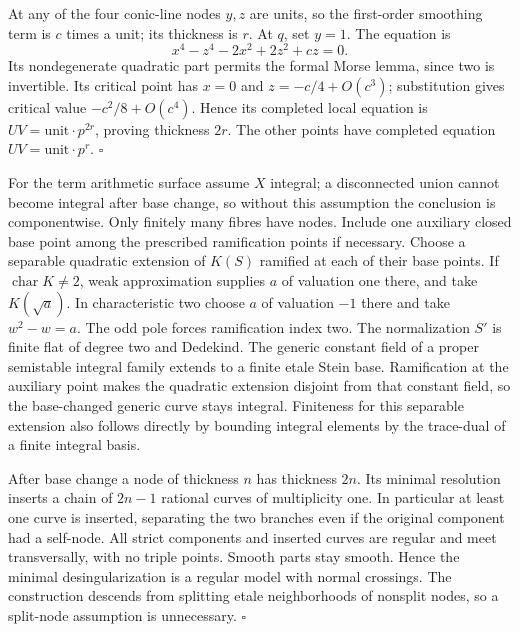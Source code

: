 \documentclass[11pt]{article}
\let\chapterexercise\exercise
\renewcommand{\exercise}[2]{\Needspace{8\baselineskip}\chapterexercise{#1}{#2}}
\begin{document}
At any of the four conic-line nodes $y,z$ are units, so the first-order smoothing term is $c$ times a unit; its thickness is $r$. At $q$, set $y=1$. The equation is
\[ x^4-z^4-2x^2+2z^2+cz=0. \]
Its nondegenerate quadratic part permits the formal Morse lemma, since two is invertible. Its critical point has $x=0$ and $z=-c/4+O(c^3)$; substitution gives critical value $-c^2/8+O(c^4)$. Hence its completed local equation is $UV=\text{unit}\cdot p^{2r}$, proving thickness $2r$. The other points have completed equation $UV=\text{unit}\cdot p^r$. \hfill$\square$

\pf For the term arithmetic surface assume $X$ integral; a disconnected union cannot become integral after base change, so without this assumption the conclusion is componentwise. Only finitely many fibres have nodes. Include one auxiliary closed base point among the prescribed ramification points if necessary. Choose a separable quadratic extension of $K(S)$ ramified at each of their base points. If $\operatorname{char}K\ne2$, weak approximation supplies $a$ of valuation one there, and take $K(\sqrt a)$. In characteristic two choose $a$ of valuation $-1$ there and take $w^2-w=a$. The odd pole forces ramification index two. The normalization $S'$ is finite flat of degree two and Dedekind. The generic constant field of a proper semistable integral family extends to a finite etale Stein base. Ramification at the auxiliary point makes the quadratic extension disjoint from that constant field, so the base-changed generic curve stays integral. Finiteness for this separable extension also follows directly by bounding integral elements by the trace-dual of a finite integral basis.

After base change a node of thickness $n$ has thickness $2n$. Its minimal resolution inserts a chain of $2n-1$ rational curves of multiplicity one. In particular at least one curve is inserted, separating the two branches even if the original component had a self-node. All strict components and inserted curves are regular and meet transversally, with no triple points. Smooth parts stay smooth. Hence the minimal desingularization is a regular model with normal crossings. The construction descends from splitting etale neighborhoods of nonsplit nodes, so a split-node assumption is unnecessary. \hfill$\square$
\end{document}
